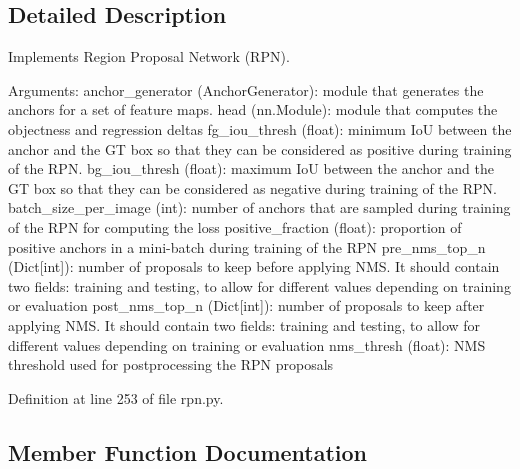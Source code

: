 \subsection{Detailed Description}
\begin{DoxyVerb}Implements Region Proposal Network (RPN).

Arguments:
    anchor_generator (AnchorGenerator): module that generates the anchors for a set of feature
        maps.
    head (nn.Module): module that computes the objectness and regression deltas
    fg_iou_thresh (float): minimum IoU between the anchor and the GT box so that they can be
        considered as positive during training of the RPN.
    bg_iou_thresh (float): maximum IoU between the anchor and the GT box so that they can be
        considered as negative during training of the RPN.
    batch_size_per_image (int): number of anchors that are sampled during training of the RPN
        for computing the loss
    positive_fraction (float): proportion of positive anchors in a mini-batch during training
        of the RPN
    pre_nms_top_n (Dict[int]): number of proposals to keep before applying NMS. It should
        contain two fields: training and testing, to allow for different values depending
        on training or evaluation
    post_nms_top_n (Dict[int]): number of proposals to keep after applying NMS. It should
        contain two fields: training and testing, to allow for different values depending
        on training or evaluation
    nms_thresh (float): NMS threshold used for postprocessing the RPN proposals\end{DoxyVerb}
 

Definition at line 253 of file rpn.\+py.



\subsection{Member Function Documentation}
\mbox{\label{classtorchvision_1_1models_1_1detection_1_1rpn_1_1RegionProposalNetwork_a900fa618bdc5e343a019476e6302b071}} 
